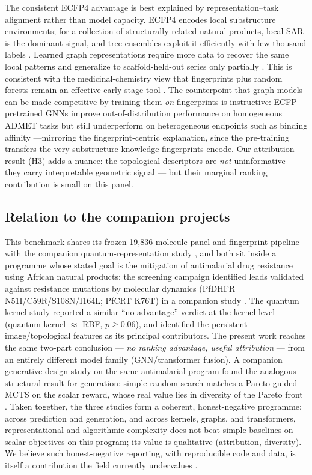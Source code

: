 \documentclass[11pt,a4paper]{article}
\begin{document}
The consistent ECFP4 advantage is best explained by representation--task alignment rather than model capacity. ECFP4 encodes local substructure environments; for a collection of structurally related natural products, local SAR is the dominant signal, and tree ensembles exploit it efficiently with few thousand labels \citep{ecfp_2010}. Learned graph representations require more data to recover the same local patterns and generalize to scaffold-held-out series only partially \citep{benchmark_pretrained_2025}. This is consistent with the medicinal-chemistry view that fingerprints plus random forests remain an effective early-stage tool \citep{learning_mol_repr_2020}. The counterpoint that graph models can be made competitive by training them \emph{on} fingerprints is instructive: ECFP-pretrained GNNs improve out-of-distribution performance on homogeneous ADMET tasks but still underperform on heterogeneous endpoints such as binding affinity \citep{ecfp_pretrained_2026}---mirroring the fingerprint-centric explanation, since the pre-training transfers the very substructure knowledge fingerprints encode. Our attribution result (H3) adds a nuance: the topological descriptors are \emph{not} uninformative --- they carry interpretable geometric signal --- but their marginal ranking contribution is small on this panel.

\subsection{Relation to the companion projects}

This benchmark shares its frozen 19,836-molecule panel and fingerprint pipeline with the companion quantum-representation study \citep{temgoua2027quantum}, and both sit inside a programme whose stated goal is the mitigation of antimalarial drug resistance using African natural products: the screening campaign \citep{temgoua2026antimalarial} identified leads validated against resistance mutations by molecular dynamics (PfDHFR N51I/C59R/S108N/I164L; PfCRT K76T) in a companion study \citep{temgoua2027md}. The quantum kernel study reported a similar ``no advantage'' verdict at the kernel level (quantum kernel $\approx$ RBF, $p \ge 0.06$), and identified the persistent-image/topological features as its principal contributors. The present work reaches the same two-part conclusion --- \emph{no ranking advantage, useful attribution} --- from an entirely different model family (GNN/transformer fusion). A companion generative-design study on the same antimalarial program found the analogous structural result for generation: simple random search matches a Pareto-guided MCTS on the scalar reward, whose real value lies in diversity of the Pareto front \citep{temgoua2027mcts}. Taken together, the three studies form a coherent, honest-negative programme: across prediction and generation, and across kernels, graphs, and transformers, representational and algorithmic complexity does not beat simple baselines on scalar objectives on this program; its value is qualitative (attribution, diversity). We believe such honest-negative reporting, with reproducible code and data, is itself a contribution the field currently undervalues \citep{benchmark_pretrained_2025,guo_ding_2026}.
\end{document}
